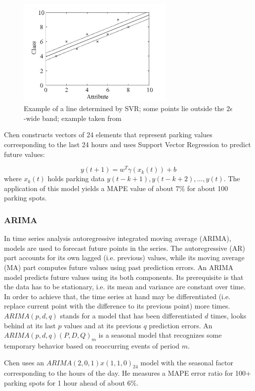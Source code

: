 \documentclass{article}
\begin{document}
\begin{figure}[!ht]
    \centering
    \includegraphics[width=3.0in]{svr}
    \caption{Example of a line determined by SVR; some points lie outside the $2\epsilon$-wide band; example taken from \cite{Witten} }
    \label{fig:svr}
\end{figure}

\vspace{2mm}
Chen\cite{Chen} constructs vectors of 24 elements that represent parking values corresponding to the last 24 hours and uses Support Vector Regression to predict future values:

$$y(t+1) = w^T\gamma(x_k(t)) + b$$
where $x_k(t)$ holds parking data $y(t-k+1), y(t-k+2), ..., y(t)$. The application of this model yields a MAPE value of about 7\% for about 100 parking spots.

\subsubsection{ARIMA}
In time series analysis autoregressive integrated moving average (ARIMA), models are used to forecast future points in the series. The autoregressive (AR) part accounts for its own lagged (i.e. previous) values, while its moving average (MA) part computes future values using past prediction errors. An ARIMA model predicts future values using its both components. Its prerequisite is that the data has to be stationary, i.e. its mean and variance are constant over time. In order to achieve that, the time series at hand may be differentiated (i.e. replace current point with the difference to its previous point) more times. $ARIMA(p,d,q)$ stands for a model that has been differentiated $d$ times, looks behind at its last $p$ values and at its previous $q$ prediction errors. An $ARIMA(p,d,q)(P,D,Q)_m$ is a seasonal model that recognizes some temporary behavior based on reoccurring events of period $m$.

\vspace{2mm}
Chen\cite{Chen} uses an $ARIMA(2,0,1) x (1,1,0)_{24}$ model with the seasonal factor corresponding to the hours of the day. He measures a MAPE error ratio for 100+ parking spots for 1 hour ahead of about 6\%.
\end{document}
